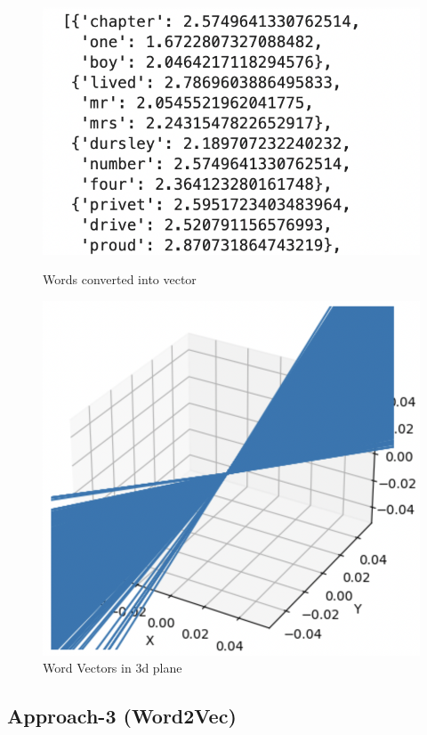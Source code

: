 \documentclass{article}
\begin{document}
\begin{figure}[H]
    \centering
    \begin{minipage}{0.5\textwidth}
        \centering
        \includegraphics[width=0.9\linewidth]{txt2vector.png}
        \caption{Words converted into vector}
        \label{fig:enter-label}
    \end{minipage}%
    \begin{minipage}{0.5\textwidth}
        \centering
        \includegraphics[width=0.9\linewidth]{VecPlot.png}
        \caption{Word Vectors in 3d plane}
        \label{fig: Word Vectors in 3d plane}
    \end{minipage}
\end{figure}

\subsection{Approach-3 (Word2Vec)}
\end{document}
